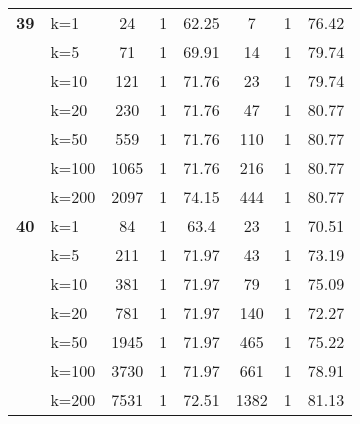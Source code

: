 \begin{table}[htbp]
\begin{tabular}{|l|l|c|c|c|c|c|c|}
    \multicolumn{1}{|r|}{\textbf{39}} & k=1 & 24 & 1 & 62.25 & 7 & 1 & 76.42 \\ 
     & k=5 & 71 & 1 & 69.91 & 14 & 1 & 79.74 \\ 
     & k=10 & 121 & 1 & 71.76 & 23 & 1 & 79.74 \\ 
     & k=20 & 230 & 1 & 71.76 & 47 & 1 & 80.77 \\ 
     & k=50 & 559 & 1 & 71.76 & 110 & 1 & 80.77 \\ 
     & k=100 & 1065 & 1 & 71.76 & 216 & 1 & 80.77 \\ 
     & k=200 & 2097 & 1 & 74.15 & 444 & 1 & 80.77 \\ \hline
    \multicolumn{1}{|r|}{\textbf{40}} & k=1 & 84 & 1 & 63.4 & 23 & 1 & 70.51 \\ 
     & k=5 & 211 & 1 & 71.97 & 43 & 1 & 73.19 \\ 
     & k=10 & 381 & 1 & 71.97 & 79 & 1 & 75.09 \\ 
     & k=20 & 781 & 1 & 71.97 & 140 & 1 & 72.27 \\ 
     & k=50 & 1945 & 1 & 71.97 & 465 & 1 & 75.22 \\ 
     & k=100 & 3730 & 1 & 71.97 & 661 & 1 & 78.91 \\ 
     & k=200 & 7531 & 1 & 72.51 & 1382 & 1 & 81.13 \\ \hline
    \end{tabular}
\end{table}
